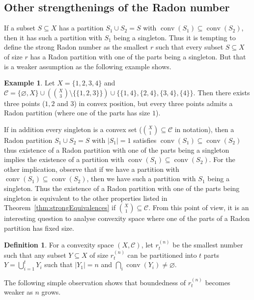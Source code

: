 \documentclass[11pt]{article}
\theoremstyle{definition}
\newtheorem{example}[thm]{Example}
\newtheorem{definition}[thm]{Definition}
\newcommand{\C}{\mathcal{C}}
\newcommand{\conv}{\operatorname{conv}}
\begin{document}
\subsection{Other strengthenings of the Radon number}\label{subsec:strong:otherRadon}

If a subset $S \subseteq X$ has a partition $S_1 \cup S_2 = S$ with $\conv(S_1) \subseteq \conv(S_2)$, then it has such a partition with $S_1$ being a singleton. Thus it is tempting to define the strong Radon number as the smallest $r$ such that every subset $S \subseteq X$ of size $r$ has a Radon partition with one of the parts being a singleton. But that is a weaker assumption as the following example shows.

\begin{example}
    Let $X = \{1,2,3,4\}$ and $\C = \{\varnothing, X\} \cup (\binom{X}{3}\setminus \{\{1,2,3\}\})\cup \{ \{1,4\}, \{2,4\}, \{3,4\}, \{4\}\}$. Then there exists three points ($1,2$ and $3$) in convex position, but every three points admits a Radon partition (where one of the parts has size $1$).
\end{example}

If in addition every singleton is a convex set ($\binom{X}{1} \subseteq \C$ in notation), then a Radon partition $S_1 \cup S_2 = S$ with $|S_1| = 1$ satisfies $\conv(S_1) \subseteq \conv(S_2)$ thus existence of a Radon partition with one of the parts being a singleton implies the existence of a partition with $\conv(S_1) \subseteq \conv(S_2)$. For the other implication, observe that if we have a partition with $\conv(S_1) \subseteq \conv(S_2)$, then we have such a partition with $S_1$ being a singleton. Thus the existence of a Radon partition with one of the parts being singleton is equivalent to the other properties listed in Theorem~\ref{thm:strongEquivalences} if $\binom{X}{1}\subseteq \C$. From this point of view, it is an interesting question to analyse convexity space where one of the parts of a Radon partition has fixed size.

\begin{definition}
    For a convexity space $(X,\C)$, let $r^{(n)}_t$ be the smallest number such that any subset $Y \subseteq X$ of size $r^{(n)}_t$ can be partitioned into $t$ parts $Y = \bigcup_{i=1}^t Y_i$ such that $|Y_1|=n$ and $\bigcap_i \conv(Y_i) \neq \varnothing$.
\end{definition}

The following simple observation shows that boundedness of $r^{(n)}_t$ becomes weaker as $n$ grows.
\end{document}
